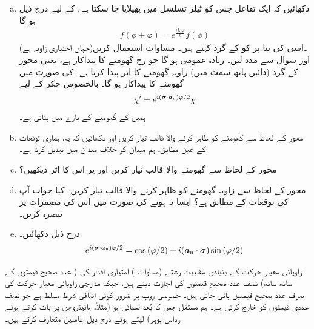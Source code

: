 \begin{enumerate}[a.]
\item
 دکھائیں کہ ایک تفاعل  جس کو ٹیلر تسلسل میں پھیلایا جا سکتا ہے، کے لیے درج ذیل ہو گا 
\begin{align*}
 f(\phi+\varphi)= e^{\frac{i L_z\varphi}{\hslash}}f(\phi)
\end{align*} 
(جہاں  اختیاری زاویہ ہے)۔اسی کی بنا پر  کو  کے گرد  کہتے ہیں۔ مساوات  استعمال کریں اور سوال  سے مدد لیں۔ زیادہ عمومی  ہو گا جو  رخ گھومنے کا پیداکار ہے، 
 یعنی  محور  کے گرد (دائیں ہاتھ سمت میں) زاویہ  گھومنے کا اثر پیدا کرتا ہے۔  کی صورت میں گھومنے کا پیداکار  ہو گا۔ بالخصوص  چکر کے لیے
\begin{align}
 \chi'=e^{i({{\boldsymbol{\sigma}}}\cdot {\ensuremath{{\boldsymbol{a}}}_{\textup{n}}})\varphi/2}\chi
\end{align}
 ہمیں  کے گھومنے کے بارے میں بتاتی ہے۔ 
\item
 محور  کے لحاظ سے گھومنے کو ظاہر کرنے والا  قالب تیار کریں اور دکھائیں کہ یہ، ہماری توقعات کے عین مطابق، ہم میدان  کو خلاف میدان  میں تبدیل کرتا ہے۔ 
\item
 محور  کے لحاظ سے گھومنے والا قالب تیار کریں اور  پر اس کا اثر دیکھیں؟ 
\item
 محور  کے لحاظ سے  زاویہ گھومنے کو ظاہر کرنے والا قالب تیار کریں۔ کیا جواب آپ کی توقعات کے مطابق ہے؟ ایسا نہ ہونے کی صورت میں اس کی مضمرات پر تبصرہ کریں۔
\item
 درج ذیل دکھائیں۔
\begin{align} e^{i({{\boldsymbol{\sigma}}}\cdot {\ensuremath{{\boldsymbol{a}}}_{\textup{n}}})\varphi/2}=\cos{(\varphi/2)}+i({{\boldsymbol{a}}_{\textup{n}}}\cdot {\ensuremath{{\boldsymbol{\sigma}}}})\sin{(\varphi/2)}
\end{align}
\end{enumerate}
زاویائی معیار حرکت کے بنیادی مقلبیت رشتے (مساوات ) امتیازی اقدار کی ( عدد صحیح قیمتوں کے ساتھ ساتھ) نصف عدد صحیح قیمتوں کی اجازت دیتے ہیں، جبکہ مدارچی زاویائی معیار حرکت کی صرف عدد صحیح قیمتیں پائی جاتی ہیں۔ خصوصی روپ  پر ضرور کوئی اضافی شرط مسلط ہے جو نصف عددی قیمتوں کو خارج کرتی ہے۔ ہم مستقل  جس کا بُعد لمبائی ہو (مثلاً، ہائیڈروجن پر بات کرتے ہوئے رداس بوہر) لیتے ہوئے درج ذیل عاملین متعارف کرتے ہیں۔

